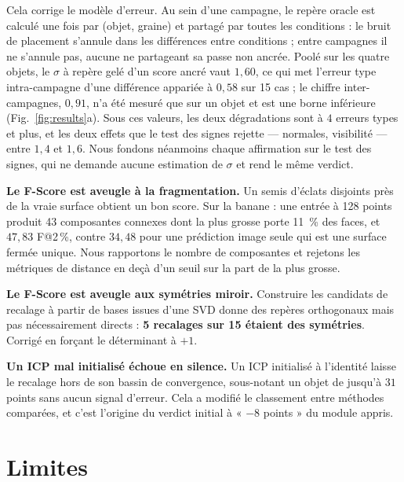 \documentclass[conference]{IEEEtran}
\makeatletter
\newcommand{\Fs}{F@2\,\%}
\makeatother
\begin{document}
Cela corrige le modèle d'erreur. Au sein d'une campagne, le repère oracle est calculé
une fois par (objet, graine) et partagé par toutes les conditions : le bruit de
placement s'annule dans les différences entre conditions ; entre campagnes il ne
s'annule pas, aucune ne partageant sa passe non ancrée. Poolé sur les quatre objets,
le $\sigma$ à repère gelé d'un score ancré vaut $1{,}60$, ce qui met l'erreur type
intra-campagne d'une différence appariée à $0{,}58$ sur 15 cas ; le chiffre
inter-campagnes, $0{,}91$, n'a été mesuré que sur un objet et est une borne inférieure
(Fig.~\ref{fig:results}a). Sous ces valeurs, les deux dégradations sont à $4$ erreurs
types et plus, et les deux effets que le test des signes rejette --- normales,
visibilité --- entre $1{,}4$ et $1{,}6$. Nous fondons néanmoins chaque affirmation sur
le test des signes, qui ne demande aucune estimation de $\sigma$ et rend le même
verdict.

\textbf{Le F-Score est aveugle à la fragmentation.} Un semis d'éclats disjoints près
de la vraie surface obtient un bon score. Sur la banane : une entrée à 128 points
produit 43 composantes connexes dont la plus grosse porte 11~\% des faces, et
$47{,}83$ \Fs, contre $34{,}48$ pour une prédiction image seule qui est une surface
fermée unique. Nous rapportons le nombre de composantes et rejetons les métriques de
distance en deçà d'un seuil sur la part de la plus grosse.

\textbf{Le F-Score est aveugle aux symétries miroir.} Construire les candidats de
recalage à partir de bases issues d'une SVD donne des repères orthogonaux mais pas
nécessairement directs : \textbf{5 recalages sur 15 étaient des symétries}. Corrigé en
forçant le déterminant à $+1$.

\textbf{Un ICP mal initialisé échoue en silence.} Un ICP initialisé à l'identité
laisse le recalage hors de son bassin de convergence, sous-notant un objet de jusqu'à
$31$ points sans aucun signal d'erreur. Cela a modifié le classement entre méthodes
comparées, et c'est l'origine du verdict initial à « $-8$ points » du module appris.

\section{Limites}
\end{document}

